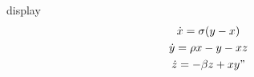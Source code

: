 display
\begin{gather}
\dot{x} = \sigma(y-x) \\
\dot{y} = \rho x - y - xz \\
\dot{z} = -\beta z + xy"
\end{gather}